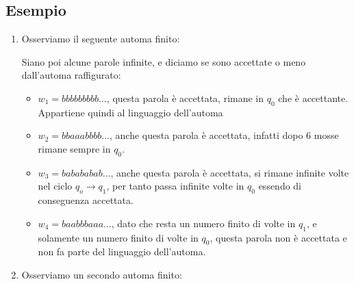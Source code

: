 \subsection{Esempio}
\begin{enumerate}
    \item Osserviamo il seguente automa finito:
        \begin{center}
        \end{center}
        
        Siano poi alcune parole infinite, e diciamo se sono accettate o meno dall'automa raffigurato:
        \begin{itemize}
            \item $w_1 = bbbbbbbbb\dots$, questa parola è accettata, rimane in $q_0$ che è accettante. Appartiene quindi al linguaggio dell'automa
            \item $w_2 = bbaaabbbb\dots$, anche questa parola è accettata, infatti dopo 6 mosse rimane sempre in $q_0$.
            \item $w_3 = babababab\dots$, anche questa parola è accettata, si rimane infinite volte nel ciclo $q_o \to q_1$, per tanto passa infinite volte in $q_0$ essendo di conseguenza accettata.
            \item $w_4 = baabbbaaa\dots$, dato che resta un numero finito di volte in $q_1$, e solamente un numero finito di volte in $q_0$, questa parola non è accettata e non fa parte del linguaggio dell'automa. 
        \end{itemize}
    \item Osserviamo un secondo automa finito:
        \begin{center}
        \end{center}
        

\end{enumerate}
